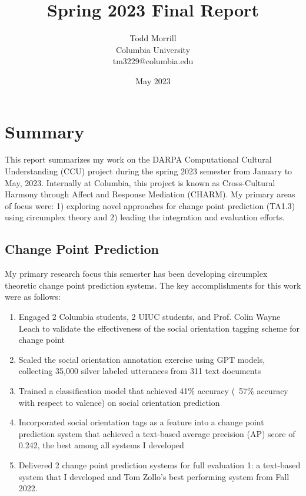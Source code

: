 \documentclass[12pt]{article}
\title{Spring 2023 Final Report}
\author{Todd Morrill\\
Columbia University\\
tm3229@columbia.edu}
\date{May 2023}
\begin{document}
\maketitle

\section{Summary}
This report summarizes my work on the DARPA Computational Cultural Understanding (CCU) \cite{DARPA_2021} project during the spring 2023 semester from January to May, 2023. Internally at Columbia, this project is known as Cross-Cultural Harmony through Affect and Response Mediation (CHARM). My primary areas of focus were: 1) exploring novel approaches for change point prediction (TA1.3) using circumplex theory and 2) leading the integration and evaluation efforts.

\subsection{Change Point Prediction} My primary research focus this semester has been developing circumplex theoretic change point prediction systems. The key accomplishments for this work were as follows:
\begin{enumerate}
    \item Engaged 2 Columbia students, 2 UIUC students, and Prof. Colin Wayne Leach to validate the effectiveness of the social orientation tagging scheme for change point
    \item Scaled the social orientation annotation exercise using GPT models, collecting 35,000 silver labeled utterances from 311 text documents
    \item Trained a classification model that achieved 41\% accuracy (~57\% accuracy with respect to valence) on social orientation prediction
    \item Incorporated social orientation tags as a feature into a change point prediction system that achieved a text-based average precision (AP) score of 0.242, the best among all systems I developed
    \item Delivered 2 change point prediction systems for full evaluation 1: a text-based system that I developed and Tom Zollo's best performing system from Fall 2022.
\end{enumerate}
\end{document}
